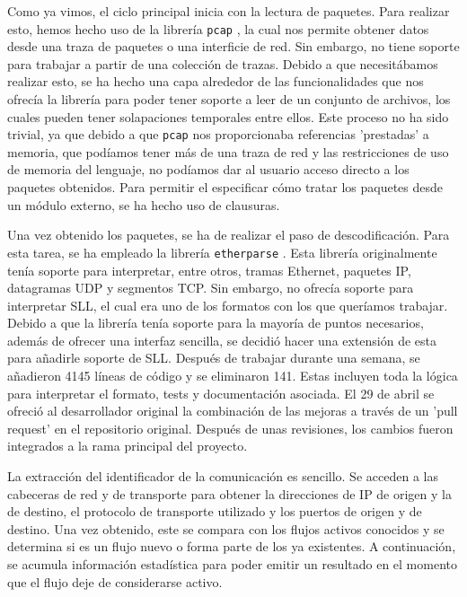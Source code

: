 \documentclass[10pt,a4paper,twoside]{article}
\begin{document}
\begin{multicols}{2}
    Como ya vimos, el ciclo principal inicia con la lectura de paquetes. Para realizar esto, hemos hecho uso de la librería \texttt{pcap} \cite{rustpcap}, la cual nos permite obtener datos desde una traza de paquetes o una interficie de red. Sin embargo, no tiene soporte para trabajar a partir de una colección de trazas. Debido a que necesitábamos realizar esto, se ha hecho una capa alrededor de las funcionalidades que nos ofrecía la librería para poder tener soporte a leer de un conjunto de archivos, los cuales pueden tener solapaciones temporales entre ellos. Este proceso no ha sido trivial, ya que debido a que \texttt{pcap} nos proporcionaba referencias 'prestadas' a memoria, que podíamos tener más de una traza de red y las restricciones de uso de memoria del lenguaje, no podíamos dar al usuario acceso directo a los paquetes obtenidos. Para permitir el especificar cómo tratar los paquetes desde un módulo externo, se ha hecho uso de clausuras.

    Una vez obtenido los paquetes, se ha de realizar el paso de descodificación. Para esta tarea, se ha empleado la librería \texttt{etherparse} \cite{etherparse}. Esta librería originalmente tenía soporte para interpretar, entre otros, tramas Ethernet, paquetes IP, datagramas UDP y segmentos TCP. Sin embargo, no ofrecía soporte para interpretar SLL, el cual era uno de los formatos con los que queríamos trabajar. Debido a que la librería tenía soporte para la mayoría de puntos necesarios, además de  ofrecer una interfaz sencilla, se decidió hacer una extensión de esta para añadirle soporte de SLL. Después de trabajar durante una semana, se añadieron 4145 líneas de código y se eliminaron 141. Estas incluyen toda la lógica para interpretar el formato, tests y documentación asociada. El 29 de abril se ofreció al desarrollador original la combinación de las mejoras a través de un 'pull request' \cite{slladdsllpr} en el repositorio original. Después de unas revisiones, los cambios fueron integrados a la rama principal del proyecto.

    La extracción del identificador de la comunicación es sencillo. Se acceden a las cabeceras de red y de transporte para obtener la direcciones de IP de origen y la de destino, el protocolo de transporte utilizado y los puertos de origen y de destino. Una vez obtenido, este se compara con los flujos activos conocidos y se determina si es un flujo nuevo o forma parte de los ya existentes. A continuación, se acumula información estadística para poder emitir un resultado en el momento que el flujo deje de considerarse activo.


\end{multicols}
\end{document}

